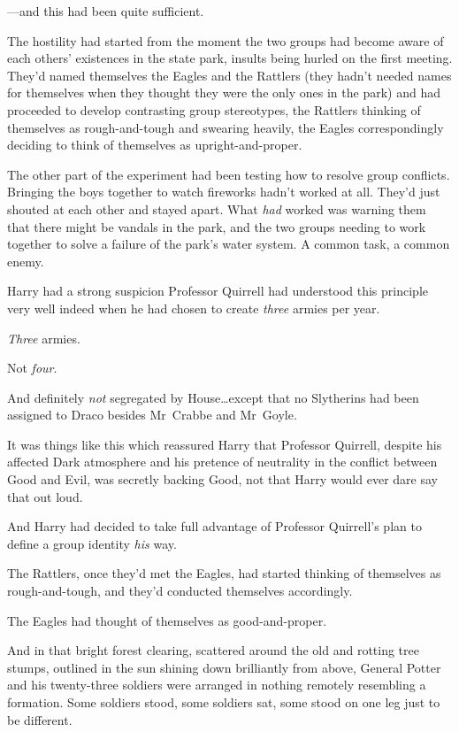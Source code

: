 —and this had been quite sufficient.

The hostility had started from the moment the two groups had become aware of each others’ existences in the state park, insults being hurled on the first meeting. They’d named themselves the Eagles and the Rattlers (they hadn’t needed names for themselves when they thought they were the only ones in the park) and had proceeded to develop contrasting group stereotypes, the Rattlers thinking of themselves as rough-and-tough and swearing heavily, the Eagles correspondingly deciding to think of themselves as upright-and-proper.

The other part of the experiment had been testing how to resolve group conflicts. Bringing the boys together to watch fireworks hadn’t worked at all. They’d just shouted at each other and stayed apart. What \emph{had} worked was warning them that there might be vandals in the park, and the two groups needing to work together to solve a failure of the park’s water system. A common task, a common enemy.

Harry had a strong suspicion Professor Quirrell had understood this principle very well indeed when he had chosen to create \emph{three} armies per year.

\emph{Three} armies.

Not \emph{four}.

And definitely \emph{not} segregated by House…except that no Slytherins had been assigned to Draco besides Mr~Crabbe and Mr~Goyle.

It was things like this which reassured Harry that Professor Quirrell, despite his affected Dark atmosphere and his pretence of neutrality in the conflict between Good and Evil, was secretly backing Good, not that Harry would ever dare say that out loud.

And Harry had decided to take full advantage of Professor Quirrell’s plan to define a group identity \emph{his} way.

The Rattlers, once they’d met the Eagles, had started thinking of themselves as rough-and-tough, and they’d conducted themselves accordingly.

The Eagles had thought of themselves as good-and-proper.

And in that bright forest clearing, scattered around the old and rotting tree stumps, outlined in the sun shining down brilliantly from above, General Potter and his twenty-three soldiers were arranged in nothing remotely resembling a formation. Some soldiers stood, some soldiers sat, some stood on one leg just to be different.

